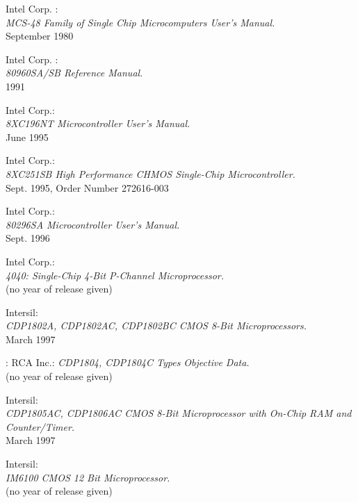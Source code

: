   Intel Corp. : \\
                 {\em MCS-48 Family of Single Chip Microcomputers User's Manual.\/} \\
                 September 1980

 Intel Corp. : \\
                 {\em 80960SA/SB Reference Manual.\/} \\
                 1991

 Intel Corp.: \\
                 {\em 8XC196NT Microcontroller User's Manual.\/} \\
                 June 1995

 Intel Corp.: \\
                 {\em 8XC251SB High Performance CHMOS Single-Chip
                  Microcontroller.\/} \\
                 Sept. 1995, Order Number 272616-003

 Intel Corp.: \\
                 {\em 80296SA Microcontroller User's Manual.\/} \\
                 Sept. 1996

 Intel Corp.: \\
                  {\em 4040: Single-Chip 4-Bit P-Channel
                   Microprocessor.\/} \\
                  (no year of release given)

 Intersil: \\
                 {\em CDP1802A, CDP1802AC, CDP1802BC CMOS 8-Bit
                  Microprocessors.\/} \\
                 March 1997

: RCA Inc.:
                 {\em CDP1804, CDP1804C Types Objective Data.} \\
                 (no year of release given)

 Intersil: \\
                 {\em CDP1805AC, CDP1806AC CMOS 8-Bit Microprocessor
                  with On-Chip RAM and Counter/Timer.\/} \\
                 March 1997

 Intersil: \\
                 {\em IM6100 CMOS 12 Bit Microprocessor.\/} \\
                 (no year of release given)

